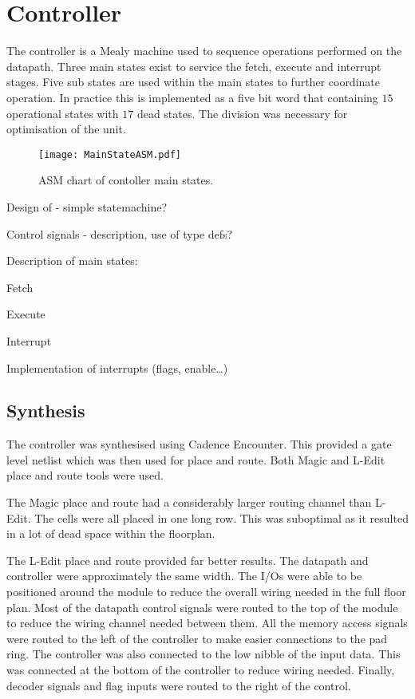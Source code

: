 \section{Controller}

The controller is a Mealy machine used to sequence operations performed on the datapath.
Three main states exist to service the fetch, execute and interrupt stages.
Five sub states are used within the main states to further coordinate operation.
In practice this is implemented as a five bit word that containing $15$ operational states with $17$ dead states. 
The division was necessary for optimisation of the unit.


\begin{figure}[ht]
   \centering
    \texttt{[image: MainStateASM.pdf]}
		\caption{ASM chart of contoller main states.}%
   \label{fig:MainStateASM}
\end{figure}



Design of - simple statemachine?

Control signals - description, use of type defs?

Description of main states:

Fetch

Execute

Interrupt

Implementation of interrupts (flags, enable\dots)


\subsection{Synthesis}

The controller was synthesised using Cadence Encounter. 
This provided a gate level netlist which was then used for place and route.
Both Magic and L-Edit place and route tools were used. 

The Magic place and route had a considerably larger routing channel than L-Edit.
The cells were all placed in one long row. 
This was suboptimal as it resulted in a lot of dead space within the floorplan.

The L-Edit place and route provided far better results. 
The datapath and controller were approximately the same width. 
The I/Os were able to be positioned around the module to reduce the overall wiring needed in the full floor plan. 
Most of the datapath control signals were routed to the top of the module to reduce the wiring channel needed between them.
All the memory access signals were routed to the left of the controller to make easier connections to the pad ring. 
The controller was also connected to the low nibble of the input data. 
This was connected at the bottom of the controller to reduce wiring needed. 
Finally, decoder signals and flag inputs were routed to the right of the control. 


